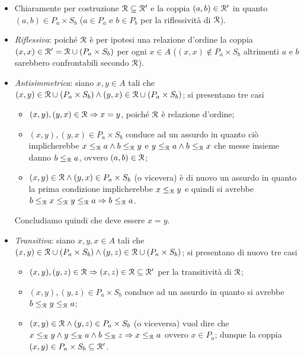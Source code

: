 \documentclass[a4paper]{article}\par \usepackage{style}\par
\begin{document}
\begin{itemize}
\item Chiaramente per costruzione $ \mathcal{R} \subseteq \mathcal{R}' $ e la coppia $ (a, b) \in \mathcal{R}' $ in quanto $ (a, b) \in P_a \times S_b $ ($ a \in P_a $ e $ b \in P_b $ per la riflessività di $ \mathcal{R} $).
\item \emph{Riflessiva}: poiché $ \mathcal{R} $ è per ipotesi una relazione d'ordine la coppia $ (x, x) \in \mathcal{R}' = \mathcal{R} \cup (P_a \times S_b) $ per ogni $ x \in A $ ($ (x, x) \notin P_a \times S_b $ altrimenti $ a $ e $ b $ sarebbero confrontabili secondo $ \mathcal{R} $).
\item \emph{Antisimmetrica}: siano $ x, y \in A $ tali che $ (x, y) \in \mathcal{R} \cup (P_a \times S_b) \wedge (y, x) \in \mathcal{R} \cup (P_a \times S_b) $; si presentano tre casi
  \begin{itemize}
  \item $ (x, y), (y, x) \in \mathcal{R} \Rightarrow x = y $, poiché $ \mathcal{R} $ è relazione d'ordine;
  \item $ (x, y), (y, x) \in P_a \times S_b $ conduce ad un assurdo in quanto ciò implicherebbe $ x \leq_{\mathcal{R}} a \wedge b \leq_{\mathcal{R}} y $ e $ y \leq_{\mathcal{R}} a \wedge b \leq_{\mathcal{R}} x $ che messe insieme danno $ b \leq_{\mathcal{R}} a $, ovvero $ (a, b) \in \mathcal{R} $;
  \item $ (x, y) \in \mathcal{R} \wedge (y, x) \in P_a \times S_b $ (o vicevera) è di nuovo un assurdo in quanto la prima condizione implicherebbe $ x \leq_{\mathcal{R}} y $ e quindi si avrebbe $ b \leq_{\mathcal{R}} x \leq_{\mathcal{R}} y \leq_{\mathcal{R}} a \Rightarrow b \leq_{\mathcal{R}} a $.
  \end{itemize}
  Concludiamo quindi che deve essere $ x = y $.
\item \emph{Transitiva}: siano $ x, y, x \in A $ tali che $ (x, y) \in \mathcal{R} \cup (P_a \times S_b) \wedge (y, z) \in \mathcal{R} \cup (P_a \times S_b) $; si presentano di nuovo tre casi
  \begin{itemize}
  \item $ (x, y), (y, z) \in \mathcal{R} \Rightarrow (x, z) \in \mathcal{R} \subseteq \mathcal{R}' $ per la transitività di $ \mathcal{R} $;
  \item $ (x, y), (y, z) \in P_a \times S_b $ conduce ad un assurdo in quanto si avrebbe $ b \leq_{\mathcal{R}} y \leq_{\mathcal{R}} a $;
  \item $ (x, y) \in \mathcal{R} \wedge (y, z) \in P_a \times S_b $ (o viceversa) vuol dire che $ x \leq_{\mathcal{R}} y \wedge y \leq_{\mathcal{R}} a \wedge b \leq_{\mathcal{R}} z \Rightarrow x \leq_{\mathcal{R}} a $ ovvero $ x \in P_a $; dunque la coppia $ (x, y) \in P_a \times S_b \subseteq \mathcal{R}' $.
  \end{itemize}

\end{itemize}
\end{document}
